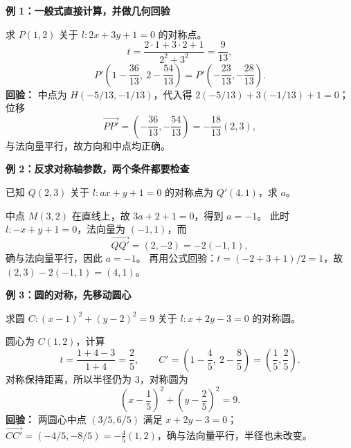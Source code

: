 \begin{examplebox}
\textbf{\textcolor{CExample}{例 1：一般式直接计算，并做几何回验}}

求 $P(1,2)$ 关于 $l:2x+3y+1=0$ 的对称点。
\[
 t=\frac{2\cdot1+3\cdot2+1}{2^2+3^2}=\frac9{13},
\]
\[
 \boxed{P'\left(1-\frac{36}{13},\ 2-\frac{54}{13}\right)
 =P'\left(-\frac{23}{13},-\frac{28}{13}\right)}.
\]
\textbf{回验：} 中点为 $H(-5/13,-1/13)$，代入得
$2(-5/13)+3(-1/13)+1=0$；位移
\[
 \overrightarrow{PP'}=\left(-\frac{36}{13},-\frac{54}{13}\right)
 =-\frac{18}{13}(2,3),
\]
与法向量平行，故方向和中点均正确。

\medskip
\textbf{\textcolor{CExample}{例 2：反求对称轴参数，两个条件都要检查}}

已知 $Q(2,3)$ 关于 $l:ax+y+1=0$ 的对称点为 $Q'(4,1)$，求 $a$。

中点 $M(3,2)$ 在直线上，故 $3a+2+1=0$，得到 $a=-1$。
此时 $l:-x+y+1=0$，法向量为 $(-1,1)$，而
\[
 \overrightarrow{QQ'}=(2,-2)=-2(-1,1),
\]
确与法向量平行，因此 $\boxed{a=-1}$。
再用公式回验：$t=(-2+3+1)/2=1$，故 $(2,3)-2(-1,1)=(4,1)$。

\medskip
\begin{minipage}{\linewidth}
\textbf{\textcolor{CExample}{例 3：圆的对称，先移动圆心}}

求圆 $C:(x-1)^2+(y-2)^2=9$ 关于 $l:x+2y-3=0$ 的对称圆。

\end{minipage}

圆心为 $C(1,2)$，计算
\[
 t=\frac{1+4-3}{1+4}=\frac25,
 \qquad C'=\left(1-\frac45,\ 2-\frac85\right)=\left(\frac15,\frac25\right).
\]
对称保持距离，所以半径仍为 $3$，对称圆为
\[
 \boxed{\left(x-\frac15\right)^2+\left(y-\frac25\right)^2=9}.
\]
\textbf{回验：} 两圆心中点 $(3/5,6/5)$ 满足 $x+2y-3=0$；
$\overrightarrow{CC'}=(-4/5,-8/5)=-\frac45(1,2)$，确与法向量平行，半径也未改变。
\end{examplebox}
